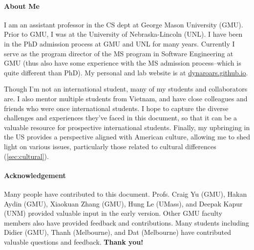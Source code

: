 \documentclass[oneside,11pt]{memoir}
\begin{document}
\paragraph{About Me} I am an assistant professor in the CS dept at George Mason University (GMU). Prior to GMU, I was at the University of Nebraska-Lincoln (UNL). I have been in the PhD admission process at GMU and UNL for many years.  Currently I serve as the program director of the MS program in Software Engineering at GMU (thus also have some experience with the MS admission process--which is quite different than PhD). My personal and lab website is at \href{https://dynaroars.github.io}{dynaroars.github.io}.

Though I'm not an international student, many of my students and collaborators are. I also mentor multiple students from Vietnam, and have close colleagues and friends who were once international students. I hope to capture the diverse challenges and experiences they've faced in this document, so that it  can be a valuable resource for prospective international students. 
Finally, my upbringing in the US provides a perspective aligned with American culture, allowing me to shed light on various issues, particularly those related to cultural differences (\autoref{sec:cultural}).




\paragraph{Acknowledgement} Many people have contributed to this document.
Profs. Craig Yu (GMU), Hakan Aydin (GMU), 
Xiaokuan Zhang (GMU), Hung Le (UMass), and Deepak Kapur (UNM) provided valuable input in the early version. Other GMU faculty members also have provided feedback and contributions.  Many students including Didier (GMU), Thanh (Melbourne), and Dat (Melbourne) have contributed valuable questions and feedback.
\textbf{Thank you!}



\end{document}
